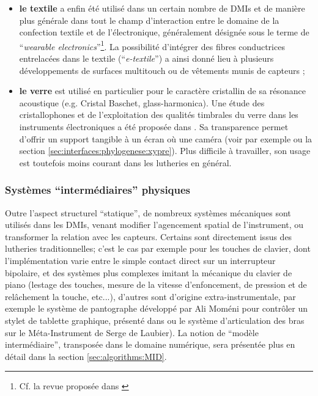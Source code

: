 \begin{itemize}[noitemsep]
	\item \textbf{le textile} a enfin été utilisé dans un certain nombre de \glspl{DMI} et de manière plus générale dans tout le champ d'interaction entre le domaine de la confection textile et de l'électronique, généralement désignée sous le terme de ``\textit{wearable electronics}''\footnote{Cf. la revue proposée dans \cite{stoppa_wearable_2014}}. La possibilité d'intégrer des fibres conductrices entrelacées dans le textile (``\textit{e-textile}'') a ainsi donné lieu à plusieurs développements de surfaces multitouch \cite{freed_application_2008, donneaud_designing_2017, wicaksono_fabrickeyboard:_2017} ou de vêtements munis de capteurs \cite{hayafuchi_musicglove_2008, serafin_controlling_2014, myllykoski_prototyping_2015};

	\item \textbf{le verre} est utilisé en particulier pour le caractère cristallin de sa résonance acoustique (e.g. Cristal Baschet, glass-harmonica). Une étude des cristallophones et de l'exploitation des qualités timbrales du verre dans les instruments électroniques a été proposée dans \cite{jensenius_evaluating_2010, frounberg_glass_2010}. Sa transparence permet d'offrir un support tangible à un écran où une caméra (voir par exemple \cite{savary_dirti_2012} ou la section \ref{sec:interfaces:phylogenese:xypre}). Plus difficile à travailler, son usage est toutefois moins courant dans les lutheries en général.
\end{itemize}

\subsubsection{Systèmes ``intermédiaires'' physiques}

\noindent Outre l'aspect structurel ``statique'', de nombreux systèmes mécaniques sont utilisés dans les \glspl{DMI}, venant modifier l'agencement spatial de l'instrument, ou transformer la relation avec les capteurs. Certains sont directement issus des lutheries traditionnelles; c'est le cas par exemple pour les touches de clavier, dont l'implémentation varie entre le simple contact direct sur un interrupteur bipolaire, et des systèmes plus complexes imitant la mécanique du clavier de piano (lestage des touches, mesure de la vitesse d'enfoncement, de pression et de relâchement la touche, etc...), d'autres sont d'origine extra-instrumentale, par exemple le système de pantographe développé par Ali Moméni pour contrôler un stylet de tablette graphique, présenté dans \cite{zbyszynski_ten_2007} ou le système d'articulation des bras sur le Méta-Instrument de Serge de Laubier). La notion de ``modèle intermédiaire'', transposée dans le domaine numérique, sera présentée plus en détail dans la section \ref{sec:algorithms:MID}.

